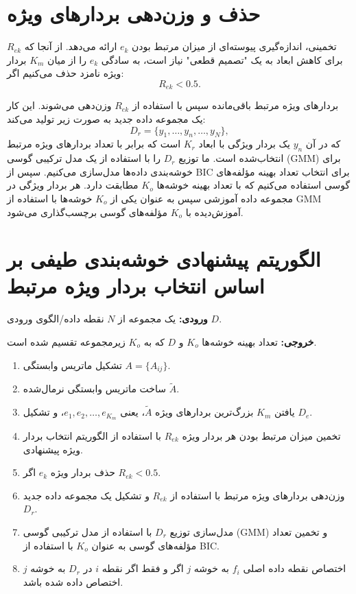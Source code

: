 \documentclass[a4paper,12pt,openany]{report}
\begin{document}
\section{حذف و وزن‌دهی بردارهای ویژه}
\( R_{ek} \) تخمینی، اندازه‌گیری پیوسته‌ای از میزان مرتبط بودن \( e_k \) ارائه می‌دهد.  
از آنجا که برای کاهش ابعاد به یک "تصمیم قطعی" نیاز است، به سادگی \( e_k \) را از میان \( K_m \) بردار ویژه نامزد حذف می‌کنیم اگر:
\[
R_{ek} < 0.5. 
\]

بردارهای ویژه مرتبط باقی‌مانده سپس با استفاده از \( R_{ek} \) وزن‌دهی می‌شوند.  
این کار یک مجموعه داده جدید به صورت زیر تولید می‌کند:
\[
D_r = \{y_1, \dots, y_n, \dots, y_N\}, 
\]
که در آن \( y_n \) یک بردار ویژگی با ابعاد \( K_r \) است که برابر با تعداد بردارهای ویژه مرتبط انتخاب‌شده است.  
ما توزیع \( D_r \) را با استفاده از یک مدل ترکیبی گوسی (GMM) برای خوشه‌بندی داده‌ها مدل‌سازی می‌کنیم.  
سپس از BIC برای انتخاب تعداد بهینه مؤلفه‌های گوسی استفاده می‌کنیم که با تعداد بهینه خوشه‌ها \( K_o \) مطابقت دارد.  
هر بردار ویژگی در مجموعه داده آموزشی سپس به عنوان یکی از \( K_o \) خوشه‌ها با استفاده از GMM آموزش‌دیده با \( K_o \) مؤلفه‌های گوسی برچسب‌گذاری می‌شود.  


\section{الگوریتم پیشنهادی خوشه‌بندی طیفی بر اساس انتخاب بردار ویژه مرتبط}

\textbf{ورودی:} یک مجموعه از \( N \) نقطه داده/الگوی ورودی \( D \).  

\textbf{خروجی:} تعداد بهینه خوشه‌ها \( K_o \) و \( D \) که به \( K_o \) زیرمجموعه تقسیم شده است.  

\begin{enumerate}
	\item تشکیل ماتریس وابستگی \( A = \{A_{ij}\} \).
	\item ساخت ماتریس وابستگی نرمال‌شده \( \tilde{A} \).
	\item یافتن \( K_m \) بزرگ‌ترین بردارهای ویژه \( \tilde{A} \)، یعنی \( e_1, e_2, \dots, e_{K_m} \)، و تشکیل \( D_e \).
	\item تخمین میزان مرتبط بودن هر بردار ویژه \( R_{ek} \) با استفاده از الگوریتم انتخاب بردار ویژه پیشنهادی.
	\item حذف بردار ویژه \( e_k \) اگر \( R_{ek} < 0.5 \).
	\item وزن‌دهی بردارهای ویژه مرتبط با استفاده از \( R_{ek} \) و تشکیل یک مجموعه داده جدید \( D_r \).
	\item مدل‌سازی توزیع \( D_r \) با استفاده از مدل ترکیبی گوسی (GMM) و تخمین تعداد مؤلفه‌های گوسی به عنوان \( K_o \) با استفاده از BIC.
	\item اختصاص نقطه داده اصلی \( f_i \) به خوشه \( j \) اگر و فقط اگر نقطه \( i \) در \( D_r \) به خوشه \( j \) اختصاص داده شده باشد.
\end{enumerate}
\end{document}
